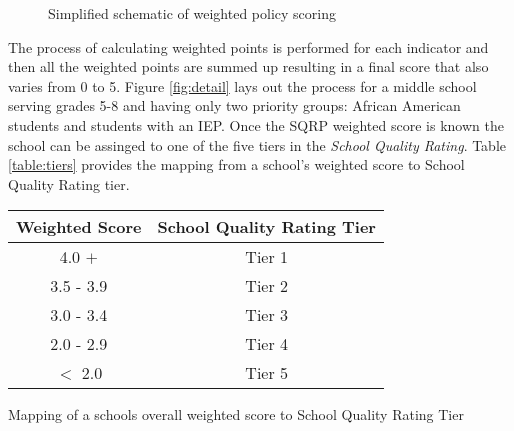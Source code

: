 \documentclass[sfsidenotes, justified]{tufte-handout}\usepackage[]{graphicx}\usepackage[]{color}
\begin{document}
\begin{figure*}\footnotesize
{}
\caption{Simplified schematic of weighted policy scoring}
\label{fig:simple}
\end{figure*}

The process of calculating weighted points is performed for each indicator and then all the weighted points are summed up resulting in a final score that also varies from 0 to 5. Figure \ref{fig:detail} lays out the process for a middle school serving grades 5-8 and having only two priority groups:  African American students and students with an IEP.  Once the SQRP weighted score is known the school can be assinged to one of the five tiers in the \emph{School Quality Rating}.  Table \ref{table:tiers} provides the mapping from a school's weighted score to School Quality Rating tier.
\begin{margintable}\scriptsize  
  \begin{tabular}{|c|c|}
    \hline
    \textbf{Weighted Score} &  \textbf{School Quality Rating Tier} \\
    \hline
    4.0 $+$     & Tier 1 \\
    3.5 - 3.9   & Tier 2 \\
    3.0 - 3.4   & Tier 3 \\
    2.0 - 2.9   & Tier 4 \\
    $<$ 2.0     & Tier 5 \\
    \hline
  \end{tabular}
  \caption{Mapping of a schools overall weighted score to School Quality Rating Tier}
  \label{table:tiers}
\end{margintable}
\end{document}
